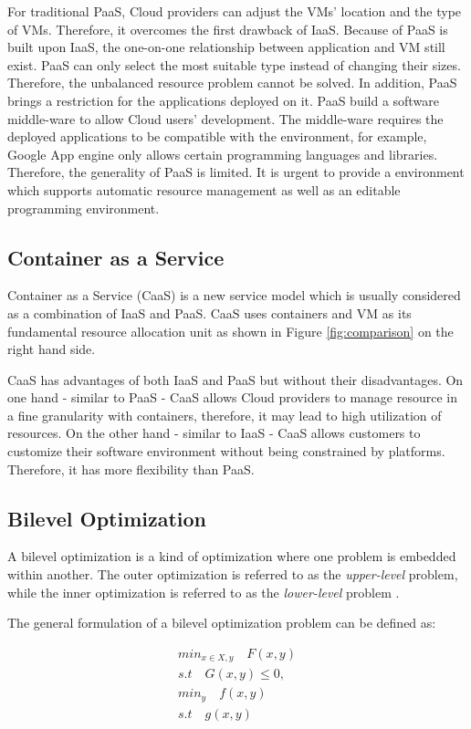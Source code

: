 For traditional PaaS, Cloud providers can adjust the VMs' location and the type of VMs. Therefore, it overcomes the first drawback of IaaS. Because of PaaS is built upon IaaS, the one-on-one relationship between application and VM still exist. PaaS can only select the most suitable type instead of changing their sizes. Therefore, the unbalanced resource problem cannot be solved. In addition, PaaS brings a restriction for the applications deployed on it. PaaS build a software middle-ware to allow Cloud users' development. The middle-ware requires the deployed applications to be compatible with the environment, for example, Google App engine only allows certain programming languages and libraries. Therefore, the generality of PaaS is limited. It is urgent to provide a environment which supports automatic resource management as well as an editable programming environment.


\subsection{Container as a Service}
Container as a Service (CaaS) \cite{Piraghaj:2017vi} is a new service model which is usually considered as a combination of IaaS and PaaS. CaaS uses containers and VM as its fundamental resource allocation unit as shown in Figure \ref{fig:comparison} on the right hand side. 


CaaS has advantages of both IaaS and PaaS  but without their disadvantages. On one hand - similar to PaaS - CaaS allows Cloud providers to manage resource in a fine granularity with containers, therefore, it may lead to high utilization of resources. On the other hand - similar to IaaS - CaaS allows customers to customize their software environment without being constrained by platforms. Therefore, it has more flexibility than PaaS.
	
\subsection{Bilevel Optimization}

A bilevel optimization \cite{Colson:2007bu} is a kind of optimization where one problem is embedded within another. The outer optimization is referred to as the \emph{upper-level} problem, while the inner optimization is referred to as the \emph{lower-level} problem . 

The general formulation of a bilevel optimization problem can be defined as: 

\begin{subequation}
\label{eq:bilevel}
	\begin{align}
	min_{x \in X, y} 	\quad    F(x, y) \\
	s.t 			\quad G(x, y) \leq 0, \\
	min_y			\quad f(x, y) \\
	s.t 			\quad g(x, y)
	\end{align}
\end{subequation}

